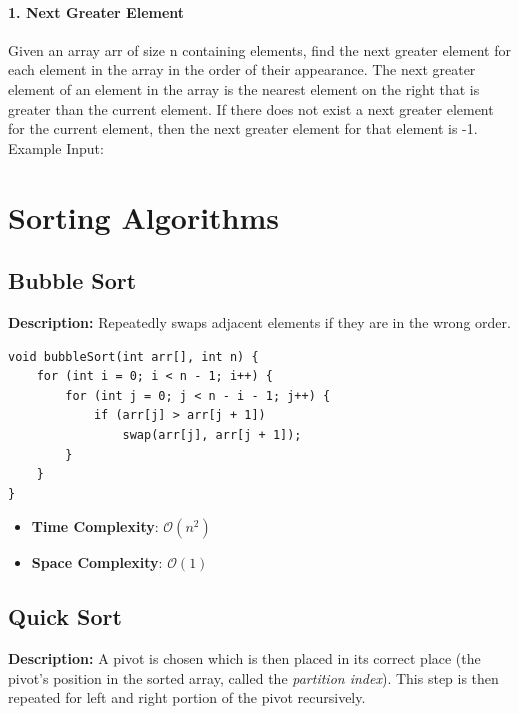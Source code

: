 \documentclass[a4paper, 12pt]{book}
\newcommand{\BigO}[1]{\mathcal{O}\left(#1\right)}
\begin{document}
	\subsubsection{1. Next Greater Element}
	Given an array arr of size n containing elements, find the next greater element for each element in the array in the order of their appearance.
	The next greater element of an element in the array is the nearest element on the right that is greater than the current element.
	If there does not exist a next greater element for the current element, then the next greater element for that element is -1.
	\newline \\
	Example
		 Input:	
		
		
	
	\chapter{Sorting Algorithms}
	\section{Bubble Sort}
	
	\textbf{Description:} Repeatedly swaps adjacent elements if they are in the wrong order.
	\begin{tcolorbox}
	\begin{Verbatim}
void bubbleSort(int arr[], int n) {
	for (int i = 0; i < n - 1; i++) {
		for (int j = 0; j < n - i - 1; j++) {
			if (arr[j] > arr[j + 1])
				swap(arr[j], arr[j + 1]);
		}
	}
}
	\end{Verbatim}
\end{tcolorbox}
	
	\begin{itemize}
		\item \textbf{Time Complexity}: $\BigO{n^2}$
		\item \textbf{Space Complexity}: $\BigO{1}$
	\end{itemize}
	
	
	
	\section{Quick Sort}
	\textbf{Description:} A pivot is chosen which is then placed in its correct place (the pivot's position in the sorted array, called the \emph{partition index}). This step is then repeated for left and right portion of the pivot recursively.
	
	
\end{document}
